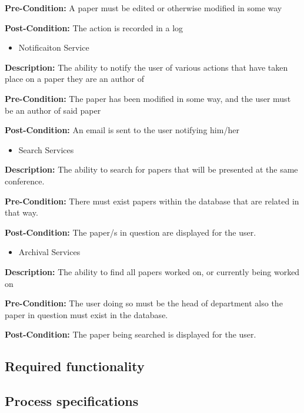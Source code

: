 \documentclass[11pt]{article}
\begin{document}
{\raggedright
	\textbf{Pre-Condition: }A paper must be edited or otherwise modified in some way
}

{\raggedright
	\textbf{Post-Condition: }The action is recorded in a log
}

\begin{itemize}
	\item Notificaiton Service
\end{itemize}

{\raggedright
	\textbf{Description: }The ability to notify the user of various actions that have taken place on a paper they are an author of
}

{\raggedright
	\textbf{Pre-Condition: }The paper has been modified in some way, and the user must be an author of said paper
}

{\raggedright
	\textbf{Post-Condition: }An email is sent to the user notifying him/her
}

\begin{itemize}
	\item Search Services
\end{itemize}

{\raggedright
	\textbf{Description: }The ability to search for papers that will be presented at the same conference.
}

{\raggedright
	\textbf{Pre-Condition: }There must exist papers within the database that are related in that way.
}

{\raggedright
	\textbf{Post-Condition: }The paper/s in question are displayed for the user.
}

\begin{itemize}
	\item Archival Services
\end{itemize}

{\raggedright
	\textbf{Description: }The ability to find all papers worked on, or currently being worked on
}

{\raggedright
	\textbf{Pre-Condition: }The user doing so must be the head of department also the paper in question must exist in the database.
}

{\raggedright
	\textbf{Post-Condition: }The paper being searched is displayed for the user.
}

\subsection{Required functionality}

\newpage

\subsection{Process specifications}
\end{document}
